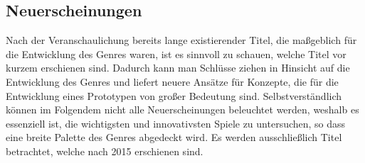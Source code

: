 \subsection{Neuerscheinungen}
Nach der Veranschaulichung bereits lange existierender Titel, die maßgeblich für die Entwicklung des Genres waren, ist es sinnvoll zu schauen, welche Titel vor kurzem erschienen sind. Dadurch kann man Schlüsse ziehen in Hinsicht auf die Entwicklung des Genres und liefert neuere Ansätze für Konzepte, die für die Entwicklung eines Prototypen von großer Bedeutung sind. Selbstverständlich können im Folgendem nicht alle Neuerscheinungen beleuchtet werden, weshalb es essenziell ist, die wichtigsten und innovativsten Spiele zu untersuchen, so dass eine breite Palette des Genres abgedeckt wird. Es werden ausschließlich Titel betrachtet, welche nach 2015 erschienen sind.

